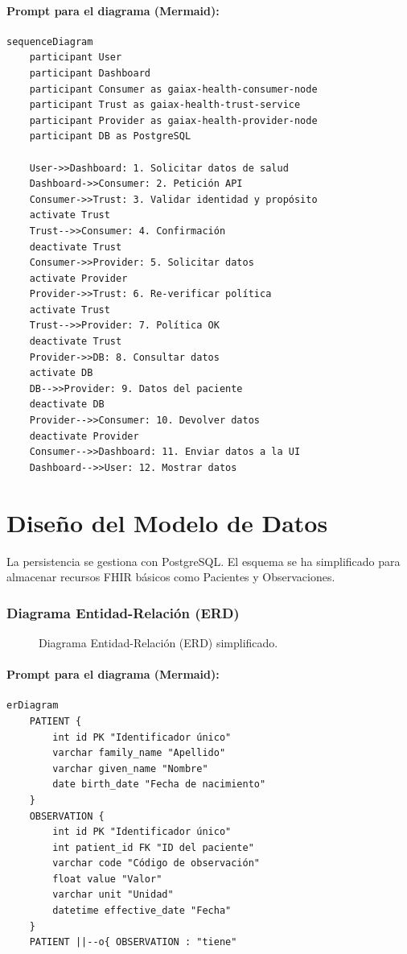 \paragraph{Prompt para el diagrama (Mermaid):}
\begin{verbatim}
sequenceDiagram
    participant User
    participant Dashboard
    participant Consumer as gaiax-health-consumer-node
    participant Trust as gaiax-health-trust-service
    participant Provider as gaiax-health-provider-node
    participant DB as PostgreSQL

    User->>Dashboard: 1. Solicitar datos de salud
    Dashboard->>Consumer: 2. Petición API
    Consumer->>Trust: 3. Validar identidad y propósito
    activate Trust
    Trust-->>Consumer: 4. Confirmación
    deactivate Trust
    Consumer->>Provider: 5. Solicitar datos
    activate Provider
    Provider->>Trust: 6. Re-verificar política
    activate Trust
    Trust-->>Provider: 7. Política OK
    deactivate Trust
    Provider->>DB: 8. Consultar datos
    activate DB
    DB-->>Provider: 9. Datos del paciente
    deactivate DB
    Provider-->>Consumer: 10. Devolver datos
    deactivate Provider
    Consumer-->>Dashboard: 11. Enviar datos a la UI
    Dashboard-->>User: 12. Mostrar datos
\end{verbatim}

\section{Diseño del Modelo de Datos}

La persistencia se gestiona con PostgreSQL. El esquema se ha simplificado para almacenar recursos FHIR básicos como Pacientes y Observaciones.

\subsubsection*{Diagrama Entidad-Relación (ERD)}
\begin{figure}[H]
    \centering
    \caption{Diagrama Entidad-Relación (ERD) simplificado.}
    \label{fig:er_diagram}
\end{figure}

\paragraph{Prompt para el diagrama (Mermaid):}
\begin{verbatim}
erDiagram
    PATIENT {
        int id PK "Identificador único"
        varchar family_name "Apellido"
        varchar given_name "Nombre"
        date birth_date "Fecha de nacimiento"
    }
    OBSERVATION {
        int id PK "Identificador único"
        int patient_id FK "ID del paciente"
        varchar code "Código de observación"
        float value "Valor"
        varchar unit "Unidad"
        datetime effective_date "Fecha"
    }
    PATIENT ||--o{ OBSERVATION : "tiene"
\end{verbatim}

